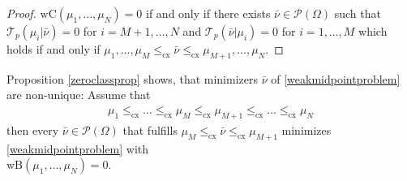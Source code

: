 \documentclass[letterpaper]{amsart}
\theoremstyle{definition}
\begin{document}
\begin{proof}
	$\text{wC}(\mu_1,\dots,\mu_N)=0$ if and only if there exists $\bar\nu\in\mathcal P(\Omega)$ such that $\mathcal T_p(\mu_i|\bar\nu)=0$ for $i=M+1,\dots,N$ and $\mathcal T_p(\bar\nu|\mu_i)=0$ for $i=1,\dots,M$ which holds if and only if $\mu_1,\dots,\mu_M\leq_{\text{cx}}\bar\nu\leq_{\text{cx}}\mu_{M+1},\dots,\mu_{N}$.
\end{proof}
Proposition \ref{zeroclassprop} shows, that minimizers $\bar\nu$ of \eqref{weakmidpointproblem} are non-unique: Assume that
\begin{gather*}
	\mu_1\leq_{\text{cx}}\dots\leq_{\text{cx}}\mu_M\leq_{\text{cx}}\mu_{M+1}\leq_{\text{cx}}\dots\leq_{\text{cx}}\mu_{N}
\end{gather*}then every $\bar\nu\in\mathcal P(\Omega)$ that fulfills $\mu_M\leq_{\text{cx}}\bar\nu\leq_{\text{cx}}\mu_{M+1}$ minimizes \eqref{weakmidpointproblem} with\\ $\text{wB}(\mu_1,\dots,\mu_N)=0$.
\end{document}
